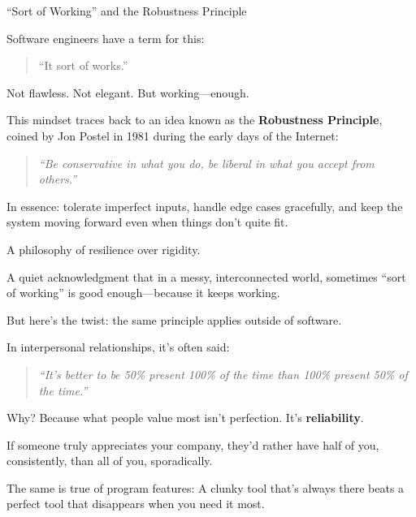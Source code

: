 \begin{HistoricalSidebar}{“Sort of Working” and the Robustness Principle}

    Software engineers have a term for this:  

    \begin{quote}
    “It sort of works.”
    \end{quote}
    
    Not flawless. Not elegant. But working—enough.

    \medskip
    
    This mindset traces back to an idea known as the \textbf{Robustness Principle}, coined by Jon Postel in 1981 during the early days of the Internet:  

    \begin{quote}
    \textit{“Be conservative in what you do, be liberal in what you accept from others.”}
    \end{quote}
    
    In essence: tolerate imperfect inputs, handle edge cases gracefully, and keep the system moving forward even when things don’t quite fit.  

    \medskip

    A philosophy of resilience over rigidity.  

    \medskip

    A quiet acknowledgment that in a messy, interconnected world, sometimes “sort of working” is good enough—because it keeps working.
    
    \medskip
    
    But here’s the twist: the same principle applies outside of software.

    \medskip
    
    In interpersonal relationships, it’s often said:  

    \begin{quote}
    \textit{“It’s better to be 50\% present 100\% of the time than 100\% present 50\% of the time.”}
    \end{quote}
    
    Why?  Because what people value most isn’t perfection.  It’s \textbf{reliability}.  

    \medskip

    If someone truly appreciates your company, they’d rather have half of you, consistently, than all of you, sporadically.

    \medskip
    
    The same is true of program features:  A clunky tool that’s always there beats a perfect tool that disappears when you need it most.
    
\end{HistoricalSidebar}

